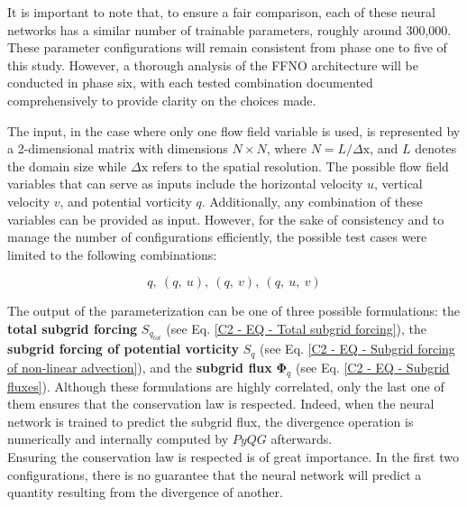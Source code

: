It is important to note that, to ensure a fair comparison, each of these neural networks has a similar number of trainable parameters, roughly around 300,000. These parameter configurations will remain consistent from phase one to five of this study. However, a thorough analysis of the FFNO architecture will be conducted in phase six, with each tested combination documented comprehensively to provide clarity on the choices made.



\vspace{0.4em}

The input, in the case where only one flow field variable is used,  is represented by a 2-dimensional matrix with dimensions $N \times N$, where $N = L/\Delta \mathrm{x}$, and $L$ denotes the domain size while $\Delta \mathrm{x}$ refers to the spatial resolution. The possible flow field variables that can serve as inputs include the horizontal velocity $u$, vertical velocity $v$, and potential vorticity $q$. Additionally, any combination of these variables can be provided as input. However, for the sake of consistency and to manage the number of configurations efficiently, the possible test cases were limited to the following combinations: 

\vspace{0.2em}
\begin{equation}
q, \ (q, \ u), \ (q, \ v), \  (q, \ u, \ v)
\label{C5 - EQ - Inputs combinations}
\end{equation}


The output of the parameterization can be one of three possible formulations: the \textbf{total subgrid forcing} $S_{q_{\textit{tot}}}$ (see Eq. \ref{C2 - EQ - Total subgrid forcing}), the \textbf{subgrid forcing of potential vorticity} $S_{q}$ (see Eq. \ref{C2 - EQ - Subgrid forcing of non-linear advection}), and the \textbf{subgrid flux} $\mathbf{\Phi}_q$ (see Eq. \ref{C2 - EQ - Subgrid fluxes}). Although these formulations are highly correlated, only the last one of them ensures that the conservation law is respected. Indeed, when the neural network is trained to predict the subgrid flux, the divergence operation is numerically and internally computed by $PyQG$ afterwards.\\

Ensuring the conservation law is respected is of great importance. In the first two configurations, there is no guarantee that the neural network will predict a quantity resulting from the divergence of another.

